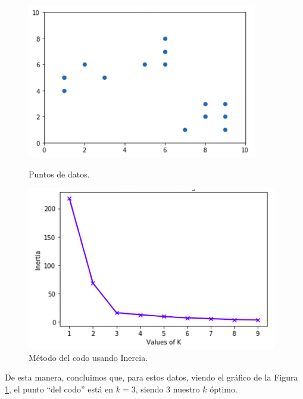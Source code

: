 \documentclass[12pt,a4paper]{article}
\begin{document}
\begin{sloppypar}
\begin{figure}[H] %
\begin{minipage}[b]{0.5\linewidth}
\centering
\includegraphics[width=\linewidth]{images/Elbow_1.png}
\caption{Puntos de datos.}
\label{fig:Elbow_1}
\end{minipage}
\hspace{0.5cm}
\begin{minipage}[b]{0.5\linewidth}
\centering
\includegraphics[width=\linewidth]{images/Elbow_2.png}
\caption{Método del codo usando Inercia.}
\label{fig:Elbow_2}
\end{minipage}
\end{figure}
 
De esta manera, concluimos que, para estos datos, viendo el gráfico de la Figura \ref{fig:Elbow_2}, el punto ``del codo'' está en $k=3$, siendo 3 nuestro $k$ óptimo. 


\end{sloppypar}
\end{document}
